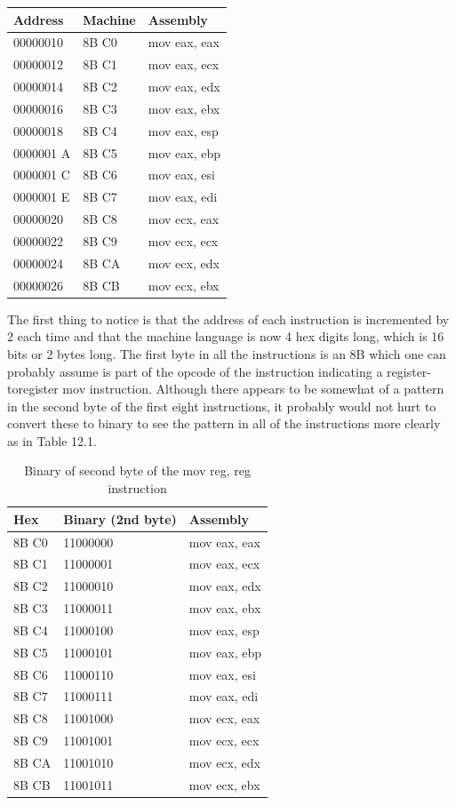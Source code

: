 \documentclass[10pt]{book}
\begin{document}
\begin{center}
\begin{tabular}{|l|l|l|}
\hline
Address & Machine & Assembly \\
\hline
00000010 & 8B C0 & mov eax, eax \\
\hline
00000012 & 8B C1 & mov eax, ecx \\
\hline
00000014 & 8B C2 & mov eax, edx \\
\hline
00000016 & 8B C3 & mov eax, ebx \\
\hline
00000018 & 8B C4 & mov eax, esp \\
\hline
0000001 A & 8B C5 & mov eax, ebp \\
\hline
0000001 C & 8B C6 & mov eax, esi \\
\hline
0000001 E & 8B C7 & mov eax, edi \\
\hline
00000020 & 8B C8 & mov ecx, eax \\
\hline
00000022 & 8B C9 & mov ecx, ecx \\
\hline
00000024 & 8B CA & mov ecx, edx \\
\hline
00000026 & 8B CB & mov ecx, ebx \\
\hline
\end{tabular}
\end{center}

The first thing to notice is that the address of each instruction is incremented by 2 each time and that the machine language is now 4 hex digits long, which is 16 bits or 2 bytes long. The first byte in all the instructions is an 8B which one can probably assume is part of the opcode of the instruction indicating a register-toregister mov instruction. Although there appears to be somewhat of a pattern in the second byte of the first eight instructions, it probably would not hurt to convert these to binary to see the pattern in all of the instructions more clearly as in Table 12.1.

\begin{table}[ht]
\centering
\begin{tabular}{|l|l|l|}
\hline
Hex & Binary (2nd byte) & Assembly \\
\hline
8B C0 & 11000000 & mov eax, eax \\
\hline
8B C1 & 11000001 & mov eax, ecx \\
\hline
8B C2 & 11000010 & mov eax, edx \\
\hline
8B C3 & 11000011 & mov eax, ebx \\
\hline
8B C4 & 11000100 & mov eax, esp \\
\hline
8B C5 & 11000101 & mov eax, ebp \\
\hline
8B C6 & 11000110 & mov eax, esi \\
\hline
8B C7 & 11000111 & mov eax, edi \\
\hline
8B C8 & 11001000 & mov ecx, eax \\
\hline
8B C9 & 11001001 & mov ecx, ecx \\
\hline
8B CA & 11001010 & mov ecx, edx \\
\hline
8B CB & 11001011 & mov ecx, ebx \\
\hline
\end{tabular}
\caption{Binary of second byte of the mov reg, reg instruction}
\end{table}
\end{document}
